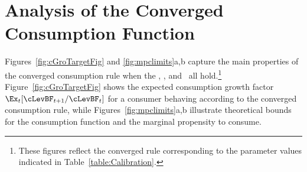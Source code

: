 \documentclass[BufferStockTheory]{subfiles}
\begin{document}
\begin{comment}
  The precautionary motive induced by the noncapital income risk can be
  thought of as being like a smoothed version of liquidity constraints.
  As cash declines toward zero, the size of the risk relative to the
  size of cash increases, which means that the relative variation in
  consumption increases, which means that the intensity of the
  precautionary motive increases.  For a more rigorous and detailed
  treatment of the relationship between precautionary saving and
  liquidity constraints, see Carroll and
  Kimball~\citeyearpar{carroll&kimball:liquidity}.
\end{comment}

\hypertarget{AnalysisoftheConvergedConsumptionFunction}{}
\section{Analysis of the Converged Consumption Function}

Figures~\ref{fig:cGroTargetFig} and \ref{fig:mpclimits}a,b capture the
main properties of the converged consumption rule when the \RIC, \GIC,
and \FHWC~all hold.\footnote{These figures reflect the converged rule
  corresponding to the parameter values indicated in
  Table~\ref{table:Calibration}.}  Figure~\ref{fig:cGroTargetFig}
shows the expected consumption growth factor
$\Ex_{t}[\cLevBF_{t+1}/\cLevBF_{t}]$ for a consumer behaving according to
the converged consumption rule, while Figures~\ref{fig:mpclimits}a,b
illustrate theoretical bounds for the consumption function and the
marginal propensity to consume.
\end{document}
